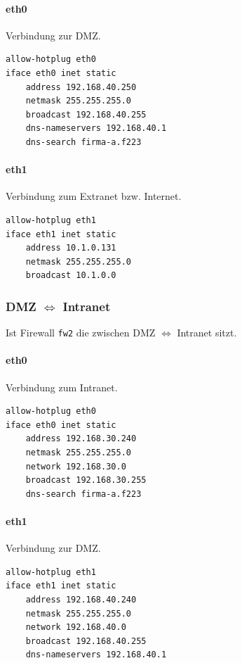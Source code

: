 \paragraph{eth0} Verbindung zur DMZ.

\begin{lstlisting}[label=lst:dmz:eth0,caption={Netzwerkadapter eth0 Konfiguration.}]
allow-hotplug eth0
iface eth0 inet static
    address 192.168.40.250
    netmask 255.255.255.0
    broadcast 192.168.40.255
    dns-nameservers 192.168.40.1
    dns-search firma-a.f223
\end{lstlisting}

\paragraph{eth1} Verbindung zum Extranet bzw. Internet.

\begin{lstlisting}[label=lst:extranet:eth1,caption={Netzwerkadapter eth1 Konfiguration.}]
allow-hotplug eth1
iface eth1 inet static
    address 10.1.0.131
    netmask 255.255.255.0
    broadcast 10.1.0.0
\end{lstlisting}


\subsubsection{DMZ $\Longleftrightarrow$ Intranet}

Ist Firewall {\tt fw2} die zwischen DMZ $\Longleftrightarrow$ Intranet sitzt.

\paragraph{eth0} Verbindung zum Intranet.

\begin{lstlisting}[label=lst:dmz:eth0,caption={Netzwerkadapter eth0 Konfiguration.}]
allow-hotplug eth0
iface eth0 inet static
    address 192.168.30.240
    netmask 255.255.255.0
    network 192.168.30.0
    broadcast 192.168.30.255
    dns-search firma-a.f223
\end{lstlisting}

\paragraph{eth1} Verbindung zur DMZ.

\begin{lstlisting}[label=lst:extranet:eth1,caption={Netzwerkadapter eth1 Konfiguration.}]
allow-hotplug eth1
iface eth1 inet static
    address 192.168.40.240
    netmask 255.255.255.0
    network 192.168.40.0
    broadcast 192.168.40.255
    dns-nameservers 192.168.40.1
\end{lstlisting}


